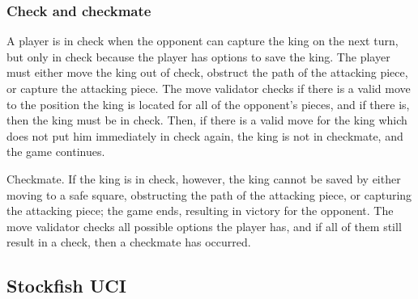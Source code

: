 \subsubsection{Check and checkmate}
A player is in check when the opponent can capture the king on the next turn, but only in check because the player has options to save the king. The player must either move the king out of check, obstruct the path of the attacking piece, or capture the attacking piece. The move validator checks if there is a valid move to the position the king is located for all of the opponent's pieces, and if there is, then the king must be in check. Then, if there is a valid move for the king which does not put him immediately in check again, the king is not in checkmate, and the game continues. 

Checkmate. If the king is in check, however, the king cannot be saved by either moving to a safe square, obstructing the path of the attacking piece, or capturing the attacking piece; the game ends, resulting in victory for the opponent. The move validator checks all possible options the player has, and if all of them still result in a check, then a checkmate has occurred.




\subsection{Stockfish UCI}

